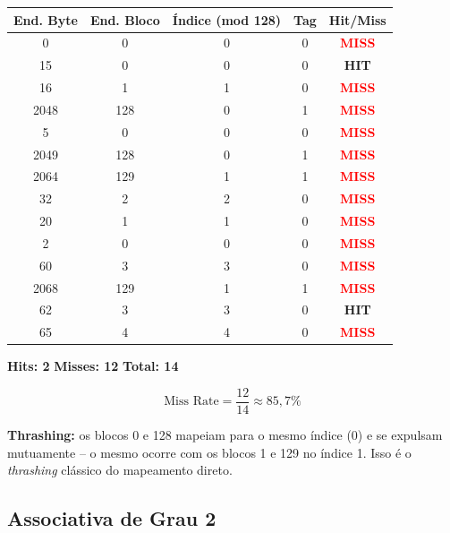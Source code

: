 \documentclass[12pt, a4paper]{article}
\begin{document}
\vspace{4pt}
\begin{tabular}{ccccc}
  \toprule
  \textbf{End. Byte} & \textbf{End. Bloco} & \textbf{Índice (mod 128)} & \textbf{Tag} & \textbf{Hit/Miss}\\
  \midrule
  0    & 0   & 0 & 0 & \textcolor{red}{\textbf{MISS}} \\
  15   & 0   & 0 & 0 & \textcolor{green!60!black}{\textbf{HIT}}  \\
  16   & 1   & 1 & 0 & \textcolor{red}{\textbf{MISS}} \\
  2048 & 128 & 0 & 1 & \textcolor{red}{\textbf{MISS}} \\
  5    & 0   & 0 & 0 & \textcolor{red}{\textbf{MISS}} \\
  2049 & 128 & 0 & 1 & \textcolor{red}{\textbf{MISS}} \\
  2064 & 129 & 1 & 1 & \textcolor{red}{\textbf{MISS}} \\
  32   & 2   & 2 & 0 & \textcolor{red}{\textbf{MISS}} \\
  20   & 1   & 1 & 0 & \textcolor{red}{\textbf{MISS}} \\
  2    & 0   & 0 & 0 & \textcolor{red}{\textbf{MISS}} \\
  60   & 3   & 3 & 0 & \textcolor{red}{\textbf{MISS}} \\
  2068 & 129 & 1 & 1 & \textcolor{red}{\textbf{MISS}} \\
  62   & 3   & 3 & 0 & \textcolor{green!60!black}{\textbf{HIT}}  \\
  65   & 4   & 4 & 0 & \textcolor{red}{\textbf{MISS}} \\
  \bottomrule
\end{tabular}

\vspace{6pt}
\textbf{Hits: 2} \quad \textbf{Misses: 12} \quad \textbf{Total: 14}

\begin{caixaazul}
  \[
    \text{Miss Rate} = \frac{12}{14} \approx 85{,}7\%
  \]
\end{caixaazul}

\begin{caixaamarela}
  \textbf{Thrashing:} os blocos 0 e 128 mapeiam para o mesmo índice (0) e se
  expulsam mutuamente -- o mesmo ocorre com os blocos 1 e 129 no índice 1.
  Isso é o \emph{thrashing} clássico do mapeamento direto.
\end{caixaamarela}

\subsection{Associativa de Grau 2}
\end{document}
